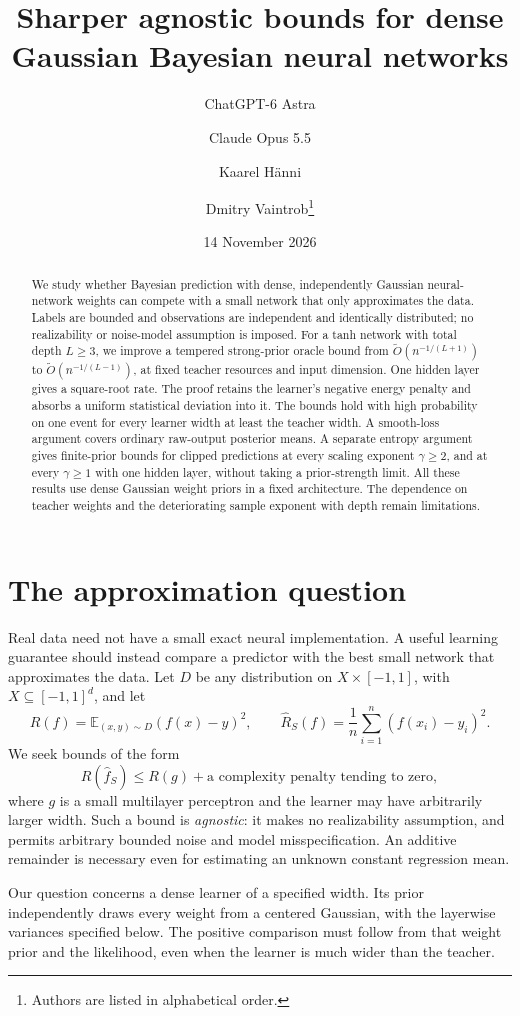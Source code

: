 \documentclass[11pt]{article}
\title{Sharper agnostic bounds for dense Gaussian Bayesian neural networks}
\author{ChatGPT-6 Astra \and Claude Opus 5.5 \and Kaarel H\"anni \and
 Dmitry Vaintrob\thanks{Authors are listed in alphabetical order.}}
\date{14 November 2026}
\theoremstyle{definition}
\theoremstyle{remark}
\newcommand{\E}{\mathbb E}
\newcommand{\Risk}{R}
\newcommand{\empRisk}{\widehat R}
\begin{document}
\maketitle
\begin{abstract}
We study whether Bayesian prediction with dense, independently Gaussian neural-network weights can compete with a small network that only approximates the data. Labels are bounded and observations are independent and identically distributed; no realizability or noise-model assumption is imposed. For a tanh network with total depth $L\ge3$, we improve a tempered strong-prior oracle bound from $\widetilde O(n^{-1/(L+1)})$ to $\widetilde O(n^{-1/(L-1)})$, at fixed teacher resources and input dimension. One hidden layer gives a square-root rate. The proof retains the learner's negative energy penalty and absorbs a uniform statistical deviation into it. The bounds hold with high probability on one event for every learner width at least the teacher width. A smooth-loss argument covers ordinary raw-output posterior means. A separate entropy argument gives finite-prior bounds for clipped predictions at every scaling exponent $\gamma\ge2$, and at every $\gamma\ge1$ with one hidden layer, without taking a prior-strength limit. All these results use dense Gaussian weight priors in a fixed architecture. The dependence on teacher weights and the deteriorating sample exponent with depth remain limitations.
\end{abstract}

\section{The approximation question}
Real data need not have a small exact neural implementation. A useful learning guarantee should instead compare a predictor with the best small network that approximates the data. Let $D$ be any distribution on $X\times[-1,1]$, with $X\subseteq[-1,1]^d$, and let
\[
 \Risk(f)=\E_{(x,y)\sim D}(f(x)-y)^2,
 \qquad \empRisk_S(f)=\frac1n\sum_{i=1}^n(f(x_i)-y_i)^2.
\]
We seek bounds of the form
\[
 \Risk(\widehat f_S)\le \Risk(g)+\text{a complexity penalty tending to zero},
\]
where $g$ is a small multilayer perceptron and the learner may have arbitrarily larger width. Such a bound is \emph{agnostic}: it makes no realizability assumption, and permits arbitrary bounded noise and model misspecification. An additive remainder is necessary even for estimating an unknown constant regression mean.

Our question concerns a dense learner of a specified width. Its prior independently draws every weight from a centered Gaussian, with the layerwise variances specified below. The positive comparison must follow from that weight prior and the likelihood, even when the learner is much wider than the teacher.
\end{document}
